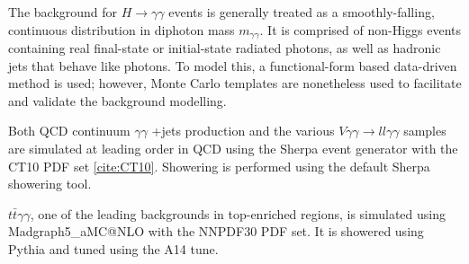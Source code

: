 \begin{table}[h!]
  \centering
  \caption{Cross sections times branching ratio values used to normalize each production mode. The values correspond to the state-of-the-art predictions and are taken from the CERN Yellow Report \ref{cite:yellowreport}.}
  \label{tab:signal_samples_norm}
\end{table}  

The background for $H \rightarrow \gamma \gamma$ events is generally treated as a smoothly-falling, continuous distribution in diphoton mass $m_{\gamma \gamma}$. It is comprised of non-Higgs events containing real final-state or initial-state radiated photons, as well as hadronic jets that behave like photons. To model this, a functional-form based data-driven method is used; however, Monte Carlo templates are nonetheless used to facilitate and validate the background modelling.

Both QCD continuum $\gamma\gamma$ +jets production and the various $V\gamma\gamma \rightarrow ll\gamma\gamma$ samples are simulated at leading order in QCD using the Sherpa event generator with the CT10 PDF set \ref{cite:CT10}. Showering is performed using the default Sherpa showering tool. 

$t\bar{t}\gamma\gamma$, one of the leading backgrounds in top-enriched regions, is simulated using Madgraph5\_aMC@NLO with the NNPDF30 PDF set. It is showered using Pythia and tuned using the A14 tune.


